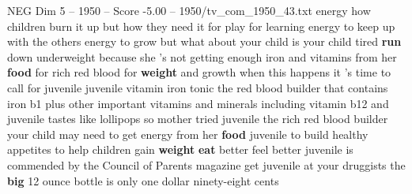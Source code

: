 \begin{textsample}{NEG Dim 5 – 1950 – Score -5.00 – 1950/tv\_com\_1950\_43.txt}  \label{ex:f5_neg_044}
energy how children burn it up but how they need it for play for learning energy to keep up with the others energy to grow but what about your child is your child tired \textbf{run} down underweight because she 's not getting enough iron and vitamins from her \textbf{food} for rich red blood for \textbf{weight} and growth when this happens it 's time to call for juvenile juvenile vitamin iron tonic the red blood builder that contains iron b1 plus other important vitamins and minerals including vitamin b12 and juvenile tastes like lollipops so mother tried juvenile the rich red blood builder your child may need to get energy from her \textbf{food} juvenile to build healthy appetites to help children gain \textbf{weight} \textbf{eat} better feel better juvenile is commended by the Council of Parents magazine get juvenile at your druggists the \textbf{big} 12 ounce bottle is only one dollar ninety-eight cents

\end{textsample}
